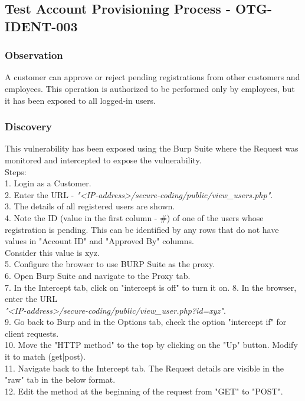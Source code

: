 \subsection{Test Account Provisioning Process - OTG-IDENT-003}

\subsubsection{Observation}
A customer can approve or reject pending registrations from other customers and employees. This operation is authorized to be performed only by employees, but it has been exposed to all logged-in users. 

\subsubsection{Discovery}
This vulnerability has been exposed using the Burp Suite where the Request was monitored and intercepted to expose the vulnerability.\\
Steps: \\
1. Login as a Customer. \\
2. Enter the URL -  \textit{"<IP-address>/secure-coding/public/view\_users.php"}. \\
3. The details of all registered users are shown. \\
4. Note the ID (value in the first column - \#) of one of the users whose registration is pending. This can be identified by any rows that do not have values in "Account ID" and "Approved By" columns.\\
Consider this value is xyz. \\
5. Configure the browser to use BURP Suite as the proxy. \\
6. Open Burp Suite and navigate to the Proxy tab. \\
7. In the Intercept tab, click on "intercept is off" to turn it on.
8. In the browser, enter the URL \\
\textit{"<IP-address>/secure-coding/public/view\_user.php?id=xyz"}. \\
9. Go back to Burp and in the Options tab, check the option "intercept if" for client requests. \\
10. Move the "HTTP method" to the top by clicking on the "Up" button. Modify it to match (get|post). \\
11. Navigate back to the Intercept tab. The Request details are visible in the "raw" tab in the below format. \\ 
12. Edit the method at the beginning of the request from "GET" to "POST". \\
